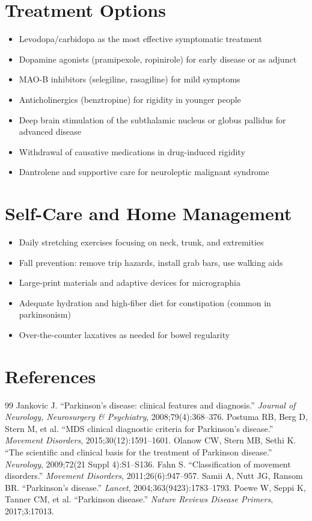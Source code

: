 \section*{Treatment Options}
\begin{itemize}
  \item Levodopa/carbidopa as the most effective symptomatic treatment
  \item Dopamine agonists (pramipexole, ropinirole) for early disease or as adjunct
  \item MAO-B inhibitors (selegiline, rasagiline) for mild symptoms
  \item Anticholinergics (benztropine) for rigidity in younger people
  \item Deep brain stimulation of the subthalamic nucleus or globus pallidus for advanced disease
  \item Withdrawal of causative medications in drug-induced rigidity
  \item Dantrolene and supportive care for neuroleptic malignant syndrome
\end{itemize}

\section*{Self-Care and Home Management}
\begin{itemize}
  \item Daily stretching exercises focusing on neck, trunk, and extremities
  \item Fall prevention: remove trip hazards, install grab bars, use walking aids
  \item Large-print materials and adaptive devices for micrographia
  \item Adequate hydration and high-fiber diet for constipation (common in parkinsonism)
  \item Over-the-counter laxatives as needed for bowel regularity
\end{itemize}

\section*{References}
\begin{thebibliography}{99}
 Jankovic J. ``Parkinson's disease: clinical features and diagnosis.'' \textit{Journal of Neurology, Neurosurgery \& Psychiatry}, 2008;79(4):368--376.
 Postuma RB, Berg D, Stern M, et al. ``MDS clinical diagnostic criteria for Parkinson's disease.'' \textit{Movement Disorders}, 2015;30(12):1591--1601.
 Olanow CW, Stern MB, Sethi K. ``The scientific and clinical basis for the treatment of Parkinson disease.'' \textit{Neurology}, 2009;72(21 Suppl 4):S1--S136.
 Fahn S. ``Classification of movement disorders.'' \textit{Movement Disorders}, 2011;26(6):947--957.
 Samii A, Nutt JG, Ransom BR. ``Parkinson's disease.'' \textit{Lancet}, 2004;363(9423):1783--1793.
 Poewe W, Seppi K, Tanner CM, et al. ``Parkinson disease.'' \textit{Nature Reviews Disease Primers}, 2017;3:17013.

\end{thebibliography}
